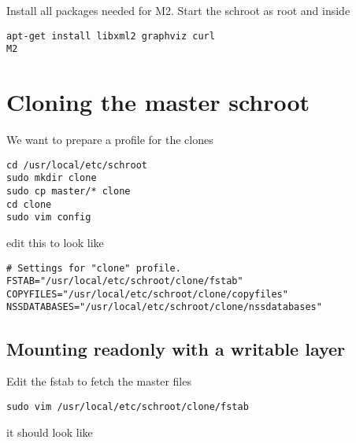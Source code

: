 \documentclass[a4paper]{book}
\begin{document}
Install all packages needed for M2. Start the schroot as root and inside

\begin{verbatim}
apt-get install libxml2 graphviz curl
M2
\end{verbatim}

\section{Cloning the master schroot}

We want to prepare a profile for the clones

\begin{verbatim}
cd /usr/local/etc/schroot
sudo mkdir clone
sudo cp master/* clone
cd clone
sudo vim config
\end{verbatim}

edit this to look like

\begin{verbatim}
# Settings for "clone" profile.
FSTAB="/usr/local/etc/schroot/clone/fstab"
COPYFILES="/usr/local/etc/schroot/clone/copyfiles"
NSSDATABASES="/usr/local/etc/schroot/clone/nssdatabases"
\end{verbatim}

\subsection{Mounting readonly with a writable layer}

Edit the fstab to fetch the master files

\begin{verbatim}
sudo vim /usr/local/etc/schroot/clone/fstab
\end{verbatim}

it should look like
\end{document}
